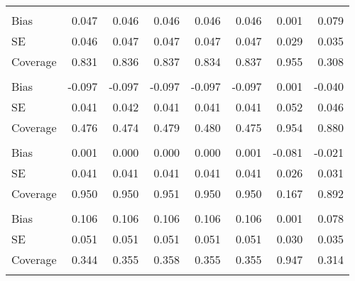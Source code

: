 \begin{table}
\begin{tabular}[t]{lddddddd}
\addlinespace[0.3em]
\\
\hspace{1em}Bias & 0.047 & 0.046 & 0.046 & 0.046 & 0.046 & 0.001 & 0.079\\
\hspace{1em}SE & 0.046 & 0.047 & 0.047 & 0.047 & 0.047 & 0.029 & 0.035\\
\hspace{1em}Coverage & 0.831 & 0.836 & 0.837 & 0.834 & 0.837 & 0.955 & 0.308\\
\addlinespace[0.3em]
\\
\hspace{1em}Bias & -0.097 & -0.097 & -0.097 & -0.097 & -0.097 & 0.001 & -0.040\\
\hspace{1em}SE & 0.041 & 0.042 & 0.041 & 0.041 & 0.041 & 0.052 & 0.046\\
\hspace{1em}Coverage & 0.476 & 0.474 & 0.479 & 0.480 & 0.475 & 0.954 & 0.880\\
\addlinespace[0.3em]
\\
\hspace{1em}Bias & 0.001 & 0.000 & 0.000 & 0.000 & 0.001 & -0.081 & -0.021\\
\hspace{1em}SE & 0.041 & 0.041 & 0.041 & 0.041 & 0.041 & 0.026 & 0.031\\
\hspace{1em}Coverage & 0.950 & 0.950 & 0.951 & 0.950 & 0.950 & 0.167 & 0.892\\
\addlinespace[0.3em]
\\
\hspace{1em}Bias & 0.106 & 0.106 & 0.106 & 0.106 & 0.106 & 0.001 & 0.078\\
\hspace{1em}SE & 0.051 & 0.051 & 0.051 & 0.051 & 0.051 & 0.030 & 0.035\\
\hspace{1em}Coverage & 0.344 & 0.355 & 0.358 & 0.355 & 0.355 & 0.947 & 0.314\\
\addlinespace[0.3em]

\end{tabular}
\end{table}
